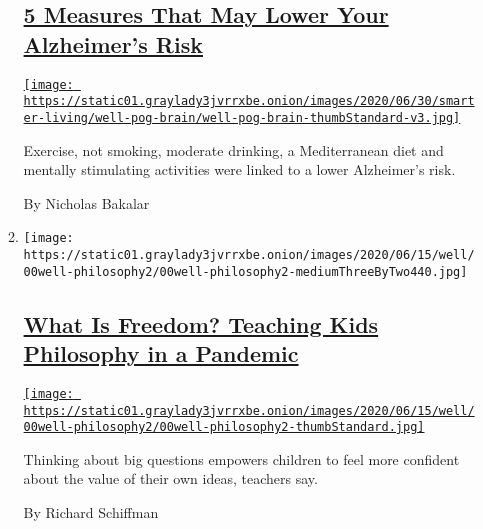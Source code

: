 \begin{enumerate}
\begin{enumerate}
    \hypertarget{5-measures-that-may-lower-your-alzheimers-risk}{%
    \subsection{\texorpdfstring{\href{/2020/06/23/well/mind/5-measures-that-may-lower-your-alzheimers-risk.html}{5
    Measures That May Lower Your Alzheimer's
    Risk}}{5 Measures That May Lower Your Alzheimer's Risk}}\label{5-measures-that-may-lower-your-alzheimers-risk}}

    \href{/2020/06/23/well/mind/5-measures-that-may-lower-your-alzheimers-risk.html}{\texttt{[image: https://static01.graylady3jvrrxbe.onion/images/2020/06/30/smarter-living/well-pog-brain/well-pog-brain-thumbStandard-v3.jpg]}}

    Exercise, not smoking, moderate drinking, a Mediterranean diet and
    mentally stimulating activities were linked to a lower Alzheimer's
    risk.

    By Nicholas Bakalar
  \item
    \texttt{[image: https://static01.graylady3jvrrxbe.onion/images/2020/06/15/well/00well-philosophy2/00well-philosophy2-mediumThreeByTwo440.jpg]}

    \hypertarget{what-is-freedom-teaching-kids-philosophy-in-a-pandemic}{%
    \subsection{\texorpdfstring{\href{/2020/06/25/well/family/children-philosophy-lessons-coronavirus.html}{What
    Is Freedom? Teaching Kids Philosophy in a
    Pandemic}}{What Is Freedom? Teaching Kids Philosophy in a Pandemic}}\label{what-is-freedom-teaching-kids-philosophy-in-a-pandemic}}

    \href{/2020/06/25/well/family/children-philosophy-lessons-coronavirus.html}{\texttt{[image: https://static01.graylady3jvrrxbe.onion/images/2020/06/15/well/00well-philosophy2/00well-philosophy2-thumbStandard.jpg]}}

    Thinking about big questions empowers children to feel more
    confident about the value of their own ideas, teachers say.

    By Richard Schiffman
  \end{enumerate}
\end{enumerate}

